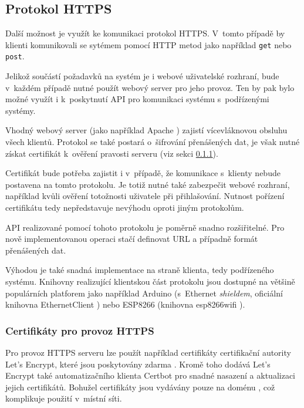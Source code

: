 \subsection{Protokol HTTPS}
\label{sec:an_https}

Další možnost je využít ke komunikaci protokol HTTPS. V~tomto případě by klienti komunikovali se sytémem pomocí HTTP metod jako například \verb|get| nebo \verb|post|.

Jelikož součástí požadavků na systém je i webové uživatelské rozhraní, bude v~každém případě nutné použít webový server pro jeho provoz. Ten by pak bylo možné využít i k~poskytnutí API pro komunikaci systému s~podřízenými systémy.

Vhodný webový server (jako například Apache \cite{apache_faq}) zajistí vícevláknovou obsluhu všech klientů. Protokol se také postará o~šifrování přenášených dat, je však nutné získat certifikát k~ověření pravosti serveru (viz sekci \ref{sec:an_certs}).

Certifikát bude potřeba zajistit i v~případě, že komunikace s~klienty nebude postavena na tomto protokolu. Je totiž nutné také zabezpečit webové rozhraní, například kvůli ověření totožnosti uživatele při přihlašování. Nutnost pořízení certifikátu tedy nepředstavuje nevýhodu oproti jiným protokolům. 

API realizované pomocí tohoto protokolu je poměrně snadno rozšiřitelné. Pro nově implementovanou operaci stačí definovat URL a případně formát přenášených dat.

Výhodou je také snadná implementace na straně klienta, tedy podřízeného systému. Knihovny realizující klientskou část protokolu jsou dostupné na většině populárních platforem jako například Arduino (s~Ethernet \textit{shieldem}, oficiální knihovna EthernetClient \cite{ard_web}) nebo ESP8266 (knihovna esp8266wifi \cite{esp_web}).

\subsubsection{Certifikáty pro provoz HTTPS}
\label{sec:an_certs}

Pro provoz HTTPS serveru lze použít například certifikáty certifikační autority Let's Encrypt, které jsou poskytovány  zdarma \cite{lets_encrypt_faq}. Kromě toho dodává Let's Encrypt také automatizačního klienta Certbot \cite{certbot} pro snadné nasazení a aktualizaci jejich certifikátů. Bohužel certifikáty jsou vydávány pouze na doménu \cite{lets_encrypt_faq}, což komplikuje použití v~místní síti.


